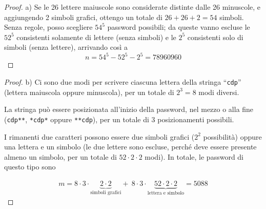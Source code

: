 \documentclass{beamer}
\renewcommand\qedsymbol{$\blacksquare$}
\begin{document}
\begin{frame}[fragile]
	\begin{proof}\renewcommand{\qedsymbol}{$\square$}
		a) Se le 26 lettere maiuscole sono considerate distinte dalle 26 minuscole, e aggiungendo 2 simboli grafici, ottengo un totale di $26+26+2=54$ simboli. Senza regole, posso scegliere $54^5$ password possibili; da queste vanno escluse le $52^5$ consistenti solamente di lettere (senza simboli) e le $2^5$ consistenti solo di simboli (senza lettere), arrivando così a
		$$
			n= 54^5 - 52^5- 2^5 = 78 960 960
		$$
		\qedhere
	\end{proof}
\end{frame}

\begin{frame}[fragile]
	\begin{proof}%
		b) Ci sono due modi per scrivere ciascuna lettera della stringa ``\texttt{cdp}'' (lettera maiuscola oppure minuscola), per un totale di $2^3=8$ modi diversi.

		\medskip

		La stringa pu\`o essere posizionata all'inizio della password, nel mezzo o alla fine (\texttt{cdp**}, \texttt{*cdp*} oppure \texttt{**cdp}), per un totale di 3 posizionamenti possibili.

		\medskip

		I rimanenti due caratteri possono essere due simboli grafici ($2^2$ possibilit\`a) oppure una lettera e un simbolo (le due lettere sono escluse, perch\'e deve essere presente almeno un simbolo, per un totale di $52\cdot2\cdot2$ modi). In totale, le password di questo tipo sono

		\begin{align*}
			m = 8 \cdot 3 \cdot \underbrace{2 \cdot 2}_{\text{simboli grafici}} + \: 8 \cdot 3 \cdot \underbrace{52 \cdot 2 \cdot 2}_{\text{lettera e simbolo}} = 5088
		\end{align*}
	\end{proof}
\end{frame}
\end{document}
